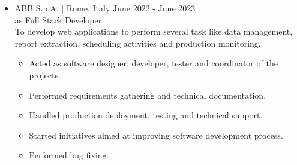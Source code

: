 \documentclass[english,10pt,a4paper]{article}
\newcommand{\Color}[1]{\textcolor{CvColor}{#1}}
\newcommand{\SubCompanyName}[1]{\textcolor{CvIcon}{{\footnotesize \textsf{#1}}}}
\newcommand{\JobTimeRange}[1]{{\scriptsize \textcolor{CvColor!50}{\faCalendar*} \hspace{0.01cm} \textcolor{CvIcon}{#1}}}
\newcommand{\CvCheck}{\textcolor{CvColor}{\faCheck}}
\begin{document}
\begin{paracol}{2}
\begin{tcolorbox}[colback=white, height=\textheight, colframe=white, left=0cm]
\begin{itemize}
{\begin{itemize}
					To develop a web application which allows users to setup and manage laser industrial machines.
					
					\begin{itemize}
						\item Acted as software developer.
						\item Updated technical documentation.
						\item Performed bug fixing.
					\end{itemize}
					
					\textcolor{CvColor}{Results:}
					\begin{itemize}
						\item Improved user interface of developed software. 
						\item Deadlines met.
					\end{itemize}
					
					\textcolor{CvColor}{Acquired skills:}
					\begin{itemize}
						\item[\CvCheck] Significanlty improved knowledge about \Color{C\#}, \Color{\texttt{git}}, \Color{Azure DevOps} and \Color{Blazor}/\Color{MudBlazor}.
						\item[\CvCheck] Slightly improved my confidence in spoken English and my ability to teamwork.
						\item[\CvCheck] I acquired a little experience with \Color{Scrum} as agile project management. 
					\end{itemize}
					
					\vspace*{0.2cm}
					\item \SubCompanyName{ABB S.p.A.} \textcolor{CvColor}{|} {\scriptsize Rome, Italy} \hfill
					\JobTimeRange{June 2022 - June 2023}\\	
					{\scriptsize \textcolor{CvIcon}{as} \textcolor{CvColor}{Full Stack Developer}}\\		
					
					To develop web applications to perform several task like data management, report extraction, scheduling activities and production monitoring.
					\begin{itemize}
						\item Acted as software designer, developer, tester and coordinator of the projects.
						\item Performed requirements gathering and technical documentation.
						\item Handled production deployment, testing and technical support.
						\item Started initiatives aimed at improving software development process.
						\item Performed bug fixing.
					\end{itemize}
					

\end{itemize}}
\end{itemize}
\end{tcolorbox}
\end{paracol}
\end{document}
